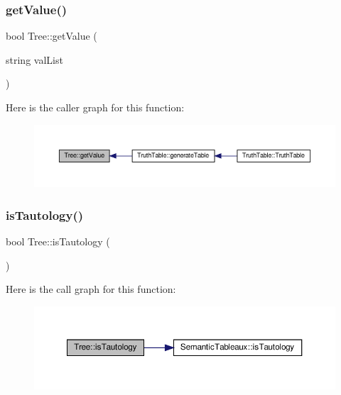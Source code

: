 \mbox{\label{class_tree_abde731a55b92d402fbbd166a577cbe91}} 
\subsubsection{\texorpdfstring{get\+Value()}{getValue()}}
{\footnotesize\ttfamily bool Tree\+::get\+Value (\begin{DoxyParamCaption}\item[{string}]{val\+List }\end{DoxyParamCaption})}

Here is the caller graph for this function\+:\nopagebreak
\begin{figure}[H]
\begin{center}
\leavevmode
\includegraphics[width=350pt]{dd/df8/class_tree_abde731a55b92d402fbbd166a577cbe91_icgraph}
\end{center}
\end{figure}
\mbox{\label{class_tree_a22efa22748fa8d8a598e05ceb327dfd4}} 
\subsubsection{\texorpdfstring{is\+Tautology()}{isTautology()}}
{\footnotesize\ttfamily bool Tree\+::is\+Tautology (\begin{DoxyParamCaption}{ }\end{DoxyParamCaption})}

Here is the call graph for this function\+:\nopagebreak
\begin{figure}[H]
\begin{center}
\leavevmode
\includegraphics[width=350pt]{dd/df8/class_tree_a22efa22748fa8d8a598e05ceb327dfd4_cgraph}
\end{center}
\end{figure}
\mbox{\label{class_tree_ad05978c3b3aaa0eefed672a5129c00a1}} 
